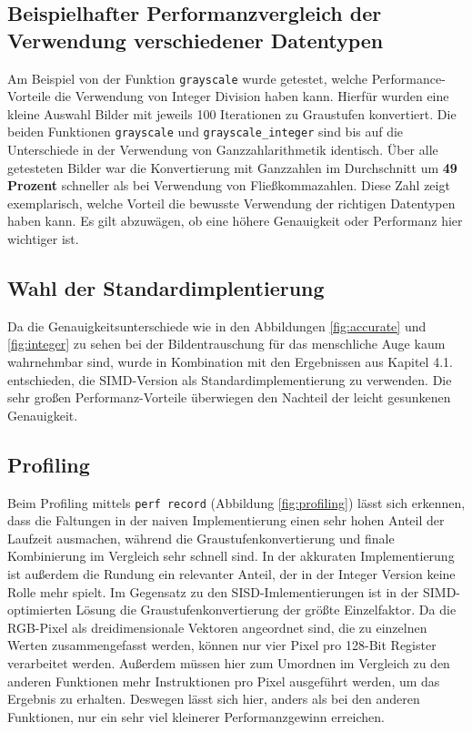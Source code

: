 \documentclass[course=erap]{aspdoc}
\begin{document}
\subsection{Beispielhafter Performanzvergleich der Verwendung verschiedener Datentypen}
Am Beispiel von der Funktion \texttt{grayscale} wurde getestet, welche Performance-Vorteile die Verwendung von Integer Division haben kann. Hierfür wurden eine kleine Auswahl Bilder mit jeweils 100 Iterationen zu Graustufen konvertiert. Die beiden Funktionen \texttt{grayscale} und \texttt{grayscale\_integer} sind bis auf die Unterschiede in der Verwendung von Ganzzahlarithmetik identisch.
Über alle getesteten Bilder war die Konvertierung mit Ganzzahlen im Durchschnitt um \textbf{49 Prozent} schneller als bei Verwendung von Fließkommazahlen. Diese Zahl zeigt exemplarisch, welche Vorteil die bewusste Verwendung der richtigen Datentypen haben kann. Es gilt abzuwägen, ob eine höhere Genauigkeit oder Performanz hier wichtiger ist.

\subsection{Wahl der Standardimplentierung}
Da die Genauigkeitsunterschiede wie in  den Abbildungen \ref{fig:accurate} und \ref{fig:integer} zu sehen bei der Bildentrauschung für das menschliche Auge kaum wahrnehmbar sind, wurde in Kombination mit den Ergebnissen aus Kapitel 4.1. entschieden, die SIMD-Version als Standardimplementierung zu verwenden. Die sehr großen Performanz-Vorteile überwiegen den Nachteil der leicht gesunkenen Genauigkeit.


\subsection{Profiling}
Beim Profiling mittels \texttt{perf record} (Abbildung \ref{fig:profiling}) lässt sich erkennen, dass die Faltungen in der naiven Implementierung einen sehr hohen Anteil der Laufzeit ausmachen, während die Graustufenkonvertierung und finale Kombinierung im Vergleich sehr schnell sind. In der akkuraten Implementierung ist außerdem die Rundung ein relevanter Anteil, der in der Integer Version keine Rolle mehr spielt. Im Gegensatz zu den SISD-Imlementierungen ist in der SIMD-optimierten Lösung die Graustufenkonvertierung der größte Einzelfaktor. Da die RGB-Pixel als dreidimensionale Vektoren angeordnet sind, die zu einzelnen Werten zusammengefasst werden, können nur vier Pixel pro 128-Bit Register verarbeitet werden. Außerdem müssen hier zum Umordnen im Vergleich zu den anderen Funktionen mehr Instruktionen pro Pixel ausgeführt werden, um das Ergebnis zu erhalten. Deswegen lässt sich hier, anders als bei den anderen Funktionen, nur ein sehr viel kleinerer Performanzgewinn erreichen. 
\end{document}
